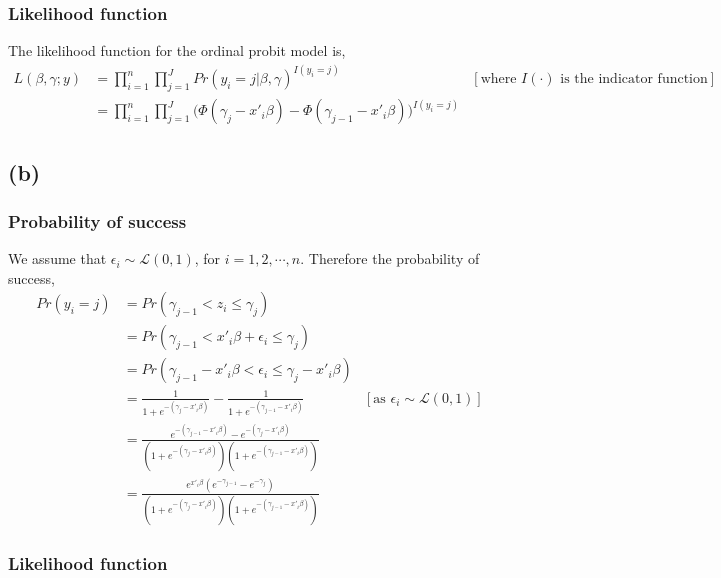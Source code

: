 \documentclass[a4paper]{article}
\begin{document}
\subsubsection*{Likelihood function}

The likelihood function for the ordinal probit model is,
\begin{align*}
    L(\beta,\gamma;y) &= \prod_{i=1}^{n}\prod_{j=1}^{J} Pr(y_i = j | \beta,\gamma)^{I(y_i = j)} &[\text{where } I(\cdot) \text{ is the indicator function}]\\
                      &= \prod_{i=1}^{n}\prod_{j=1}^{J} \Big(\Phi(\gamma_j - x'_{i}\beta) - \Phi(\gamma_{j-1} - x'_{i}\beta)\Big)^{I(y_i = j)}
\end{align*}

\subsection*{(b)}

\subsubsection*{Probability of success}

We assume that $\epsilon_i \sim \mathcal{L}(0,1)$, for $i = 1,2, \cdots, n$. Therefore the probability of success,
\begin{align*}
    Pr(y_i = j) &= Pr(\gamma_{j-1} < z_{i} \leq \gamma_j)\\
                &= Pr(\gamma_{j-1} < x'_{i}\beta + \epsilon_{i} \leq \gamma_j) \\
                &= Pr(\gamma_{j-1} - x'_{i}\beta < \epsilon_{i} \leq \gamma_j - x'_{i}\beta) \\
                &= \frac{1}{1+e^{-(\gamma_j - x'_{i}\beta)}} - \frac{1}{1+e^{-(\gamma_{j-1} - x'_{i}\beta)}} & [\text{as } \epsilon_i \sim \mathcal{L}(0,1)] \\
                &= \frac{e^{-(\gamma_{j-1} - x'_{i}\beta)} - e^{-(\gamma_{j} - x'_{i}\beta)}}{(1+e^{-(\gamma_j - x'_{i}\beta)})(1+e^{-(\gamma_{j-1} - x'_{i}\beta)})} \\
                &= \frac{e^{x'_i\beta}(e^{-\gamma_{j-1}} - e^{-\gamma_{j}})}{(1+e^{-(\gamma_j - x'_{i}\beta)})(1+e^{-(\gamma_{j-1} - x'_{i}\beta)})} 
\end{align*}

\subsubsection*{Likelihood function}
\end{document}
